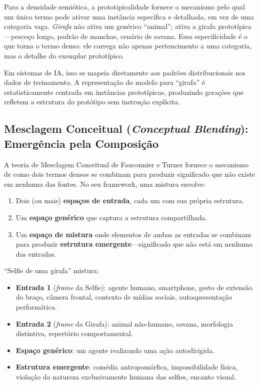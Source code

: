 \documentclass[12pt,a4paper]{article}
\begin{document}
Para a densidade semiótica, a prototipicalidade fornece o mecanismo pelo qual um único termo pode ativar uma instância específica e detalhada, em vez de uma categoria vaga.
\textit{Girafa} não ativa um genérico ``animal''; ativa a girafa prototípica---pescoço longo, padrão de manchas, cenário de savana.
Essa especificidade é o que torna o termo denso: ele carrega não apenas pertencimento a uma categoria, mas o detalhe do exemplar prototípico.

Em sistemas de IA, isso se mapeia diretamente aos padrões distribucionais nos dados de treinamento.
A representação do modelo para ``girafa'' é estatisticamente centrada em instâncias prototípicas, produzindo gerações que refletem a estrutura do protótipo sem instrução explícita.

\subsection{Mesclagem Conceitual (\textit{Conceptual Blending}): Emergência pela Composição}
\label{subsec:blending}

A teoria de Mesclagem Conceitual de Fauconnier e Turner \cite{fauconnier2002} fornece o mecanismo de como dois termos densos se combinam para produzir significado que não existe em nenhuma das fontes.
No seu framework, uma mistura envolve:

\begin{enumerate}
  \item Dois (ou mais) \textbf{espaços de entrada}, cada um com sua própria estrutura.
  \item Um \textbf{espaço genérico} que captura a estrutura compartilhada.
  \item Um \textbf{espaço de mistura} onde elementos de ambas as entradas se combinam para produzir \textbf{estrutura emergente}---significado que não está em nenhuma das entradas.
\end{enumerate}

``Selfie de uma girafa'' mistura:
\begin{itemize}
  \item \textbf{Entrada 1} (\textit{frame} da Selfie): agente humano, smartphone, gesto de extensão do braço, câmera frontal, contexto de mídias sociais, autoapresentação performática.
  \item \textbf{Entrada 2} (\textit{frame} da Girafa): animal não-humano, savana, morfologia distintiva, repertório comportamental.
  \item \textbf{Espaço genérico}: um agente realizando uma ação autodirigida.
  \item \textbf{Estrutura emergente}: comédia antropomórfica, impossibilidade física, violação da natureza exclusivamente humana das selfies, encanto visual.
\end{itemize}
\end{document}
